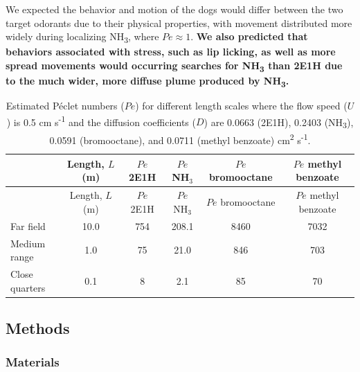 \documentclass[
]{article}
\begin{document}
We expected the behavior and motion of the dogs would differ between the two target odorants due to their physical properties, with movement distributed more widely during localizing NH\textsubscript{3}, where \(Pe \approx 1\). \textbf{We also predicted that behaviors associated with stress, such as lip licking, as well as more spread movements would occurring searches for NH\textsubscript{3} than 2E1H due to the much wider, more diffuse plume produced by NH\textsubscript{3}.}

\begin{longtable}[]{@{}lccccc@{}}
\caption{\label{tab:pe-table}Estimated Péclet numbers (\(Pe\)) for different length scales where the flow speed (\(U\)) is 0.5 cm s\textsuperscript{-1} and the diffusion coefficients (\(D\)) are 0.0663 (2E1H), 0.2403 (NH\textsubscript{3}), 0.0591 (bromooctane), and 0.0711 (methyl benzoate) cm\textsuperscript{2} s\textsuperscript{-1}.}\tabularnewline
\toprule\noalign{}
& Length, \(L\) (m) & \(Pe\) 2E1H & \(Pe\) NH\(_3\) & \(Pe\) bromooctane & \(Pe\) methyl benzoate \\
\midrule\noalign{}
\endfirsthead
\toprule\noalign{}
& Length, \(L\) (m) & \(Pe\) 2E1H & \(Pe\) NH\(_3\) & \(Pe\) bromooctane & \(Pe\) methyl benzoate \\
\midrule\noalign{}
\endhead
\bottomrule\noalign{}
\endlastfoot
Far field & 10.0 & 754 & 208.1 & 8460 & 7032 \\
Medium range & 1.0 & 75 & 21.0 & 846 & 703 \\
Close quarters & 0.1 & 8 & 2.1 & 85 & 70 \\
\end{longtable}

\hypertarget{methods}{%
\subsection{Methods}\label{methods}}

\hypertarget{materials}{%
\subsubsection{Materials}\label{materials}}
\end{document}
